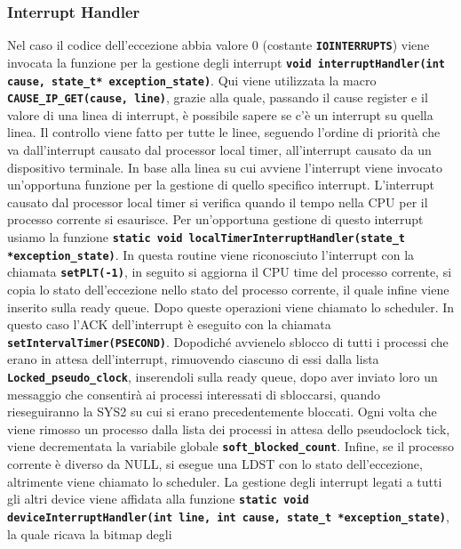\documentclass{article}
\newcounter{subsubsubsection}
\begin{document}
	\subsubsection{Interrupt Handler}
	Nel caso il codice dell'eccezione abbia valore 0 (costante \texttt{\textbf{IOINTERRUPTS}})
	viene invocata la funzione per la gestione degli interrupt \texttt{\textbf{void
	interruptHandler(int cause, state\_t* exception\_state)}}. Qui viene
	utilizzata la macro \texttt{\textbf{CAUSE\_IP\_GET(cause, line)}}, grazie alla
	quale, passando il cause register e il valore di una linea di interrupt, è
	possibile sapere se c'è un interrupt su quella linea. Il controllo viene fatto
	per tutte le linee, seguendo l'ordine di priorità che va dall'interrupt
	causato dal processor local timer, all'interrupt causato da un dispositivo terminale.
	In base alla linea su cui avviene l'interrupt viene invocato un'opportuna
	funzione per la gestione di quello specifico interrupt. 
	L'interrupt causato dal processor local timer si verifica quando il tempo
	nella CPU per il processo corrente si esaurisce. Per un'opportuna gestione di questo
	interrupt usiamo la funzione \texttt{\textbf{static void
	localTimerInterruptHandler(state\_t *exception\_state)}}. In questa routine viene
	riconosciuto l'interrupt con la chiamata \texttt{\textbf{setPLT(-1)}}, in seguito
	si aggiorna il CPU time del processo corrente, si copia lo stato dell'eccezione
	nello stato del processo corrente, il quale infine viene inserito sulla ready queue.
	Dopo queste operazioni viene chiamato lo scheduler. 
	In questo caso l'ACK dell'interrupt è eseguito con la chiamata \texttt{\textbf{setIntervalTimer(PSECOND)}}.
	Dopodiché avvienelo sblocco di tutti i processi che erano in attesa dell'interrupt,
	rimuovendo ciascuno di essi dalla lista \texttt{\textbf{Locked\_pseudo\_clock}},
	inserendoli sulla ready queue, dopo aver inviato loro un messaggio che
	consentirà ai processi interessati di sbloccarsi, quando rieseguiranno la SYS2
	su cui si erano precedentemente bloccati. Ogni volta che viene rimosso un
	processo dalla lista dei processi in attesa dello pseudoclock tick, viene decrementata
	la variabile globale \texttt{\textbf{soft\_blocked\_count}}. Infine, se il
	processo corrente è diverso da NULL, si esegue una LDST con lo stato dell'eccezione,
	altrimente viene chiamato lo scheduler. 
	La gestione degli interrupt legati a tutti gli altri device viene affidata
	alla funzione \texttt{\textbf{static void deviceInterruptHandler(int line, int
	cause, state\_t *exception\_state)}}, la quale ricava la bitmap degli
\end{document}
